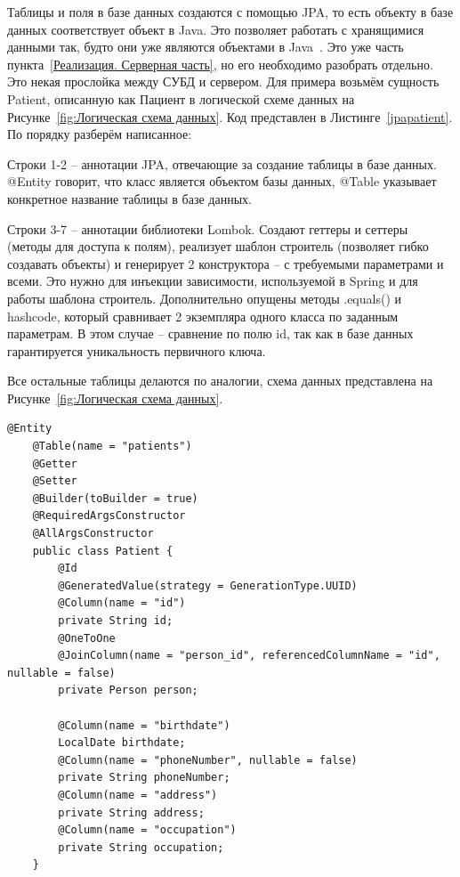 \documentclass[a4paper,article]{article}
\begin{document}
\begin{sloppypar}
    Таблицы и поля в базе данных создаются с помощью JPA, то есть объекту в базе данных соответствует объект в Java. Это позволяет работать с хранящимися данными так, будто они уже являются объектами в Java~\cite{baeldungbook}. Это уже часть пункта~\ref{Реализация. Серверная часть}, но его необходимо разобрать отдельно. Это некая прослойка между СУБД и сервером. Для примера возьмём сущность Patient, описанную как Пациент в логической схеме данных на Рисунке~\ref{fig:Логическая схема данных}. Код представлен в Листинге~\ref{jpapatient}. По порядку разберём написанное:

    Строки 1-2 -- аннотации JPA, отвечающие за создание таблицы в базе данных. @Entity говорит, что класс является объектом базы данных, @Table указывает конкретное название таблицы в базе данных.

    Строки 3-7 -- аннотации библиотеки Lombok. Создают геттеры и сеттеры (методы для доступа к полям), реализует шаблон строитель (позволяет гибко создавать объекты) и генерирует 2 конструктора -- с требуемыми параметрами и всеми. Это нужно для инъекции зависимости, используемой в Spring и для работы шаблона строитель. Дополнительно опущены методы .equals() и hashcode, который сравнивает 2 экземпляра одного класса по заданным параметрам. В этом случае -- сравнение по полю id, так как в базе данных гарантируется уникальность первичного ключа.

    Все остальные таблицы делаются по аналогии, схема данных представлена на Рисунке~\ref{fig:Логическая схема данных}.

    \begin{lstlisting}[label=jpapatient,caption=Пример реализации таблицы Patient через JPA]
    @Entity
    @Table(name = "patients")
    @Getter
    @Setter
    @Builder(toBuilder = true)
    @RequiredArgsConstructor
    @AllArgsConstructor
    public class Patient {
        @Id
        @GeneratedValue(strategy = GenerationType.UUID)
        @Column(name = "id")
        private String id;
        @OneToOne
        @JoinColumn(name = "person_id", referencedColumnName = "id", nullable = false)
        private Person person;

        @Column(name = "birthdate")
        LocalDate birthdate;
        @Column(name = "phoneNumber", nullable = false)
        private String phoneNumber;
        @Column(name = "address")
        private String address;
        @Column(name = "occupation")
        private String occupation;
    }
    \end{lstlisting}


\end{sloppypar}
\end{document}
